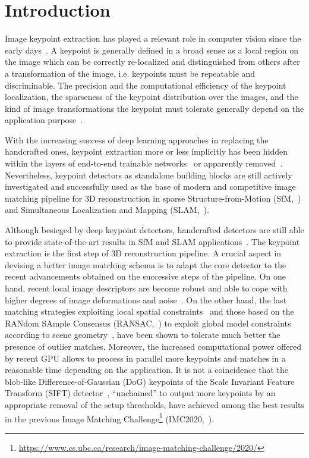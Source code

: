 \documentclass[times,twocolumn,final,authoryear]{elsarticle}
\begin{document}
\vspace{-1em}
\section{Introduction}\label{introduction}
\vspace{-0.5em}
Image keypoint extraction has played a relevant role in computer vision since the early days~\citep{szeliski_book}. A keypoint is generally defined in a broad sense as a local region on the image which can be correctly re-localized and distinguished from others after a transformation of the image, i.e. keypoints must be repeatable and discriminable. The precision and the computational efficiency of the keypoint localization, the sparseness of the keypoint distribution over the images, and the kind of image transformations the keypoint must tolerate generally depend on the application purpose~\citep{local_invariant_feature_survey}.

With the increasing success of deep learning approaches in replacing the handcrafted ones, keypoint extraction more or less implicitly has been hidden within the layers of end-to-end trainable networks~\citep{d2net,d2d,superpoint,loftr} or apparently removed~\citep{dense}. Nevertheless, keypoint detectors as standalone building blocks are still actively investigated and successfully used as the base of modern and competitive image matching pipeline for 3D reconstruction in sparse Structure-from-Motion (SfM,~\cite{colmap}) and Simultaneous Localization and Mapping (SLAM,~\cite{orbslam}).

Although besieged by deep keypoint detectors, handcrafted detectors are still able to provide state-of-the-art results in SfM and SLAM applications~\citep{imw2020}. The keypoint extraction is the first step of 3D reconstruction pipeline. A crucial aspect in devising a better image matching schema is to adapt the core detector to the recent advancements obtained on the successive steps of the pipeline. On one hand, recent local image descriptors are become robust and able to cope with higher degrees of image deformations and noise~\citep{hardnet}. On the other hand, the last matching strategies exploiting local spatial constraints~\citep{blob_dtm} and those based on the RANdom SAmple Consensus (RANSAC,~\cite{ransac}) to exploit global model constraints according to scene geometry~\citep{adalam}, have been shown to tolerate much better the presence of outlier matches. Moreover, the increased computational power offered by recent GPU allows to process in parallel more keypoints and matches in a reasonable time depending on the application. It is not a coincidence that the blob-like Difference-of-Gaussian (DoG) keypoints of the Scale Invariant Feature Transform (SIFT) detector~\citep{sift}, ``unchained'' to output more keypoints by an appropriate removal of the setup thresholds, have achieved among the best results in the previous Image Matching Challenge\footnote{\scriptsize{\url{https://www.cs.ubc.ca/research/image-matching-challenge/2020/}}} (IMC2020,~\cite{imw2020}).
\end{document}
